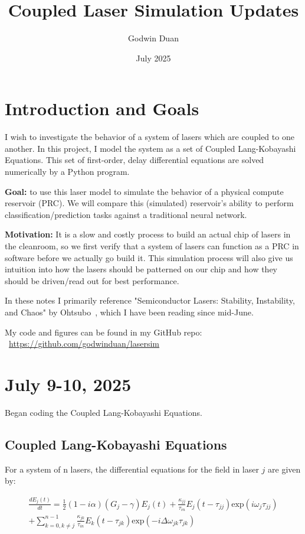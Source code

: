 \documentclass[11pt,letterpaper]{article}
\title{Coupled Laser Simulation Updates}
\author{Godwin Duan}
\date{July 2025}
\begin{document}
\maketitle

\section*{Introduction and Goals}
I wish to investigate the behavior of a system of lasers which are coupled to one another. In this project, I model the system as a set of Coupled Lang-Kobayashi Equations. This set of first-order, delay differential equations are solved numerically by a Python program.

\textbf{Goal:} to use this laser model to simulate the behavior of a physical compute reservoir (PRC). We will compare this (simulated) reservoir's ability to perform classification/prediction tasks against a traditional neural network.

\textbf{Motivation:} It is a slow and costly process to build an actual chip of lasers in the cleanroom, so we first verify that a system of lasers can function as a PRC in software before we actually go build it. This simulation process will also give us intuition into how the lasers should be patterned on our chip and how they should be driven/read out for best performance.

In these notes I primarily reference "Semiconductor Lasers: Stability, Instability, and Chaos" by Ohtsubo~\cite{ohtsubo2017semiconductor}, which I have been reading since mid-June.

My code and figures can be found in my GitHub repo: ~\href{https://github.com/godwinduan/lasersim}{https://github.com/godwinduan/lasersim}

\section{July 9-10, 2025}
Began coding the Coupled Lang-Kobayashi Equations.

\subsection{Coupled Lang-Kobayashi Equations}

For a system of n lasers, the differential equations for the field in laser $j$ are given by:

\begin{multline}
\frac{dE_j(t)}{dt} = \frac{1}{2} (1 - i \alpha) (G_j - \gamma) E_j(t) + \frac{\kappa_{jj}}{\tau_{in}} E_j(t - \tau_{jj}) \text{exp}(i \omega_j \tau_{jj}) \\
+ \sum^{n - 1}_{k=0, k\neq j} \frac{\kappa_{jk}}{\tau_{in}} E_k(t - \tau_{jk}) \text{exp}(-i \Delta\omega_{jk} \tau_{jk})
\end{multline}
\end{document}
